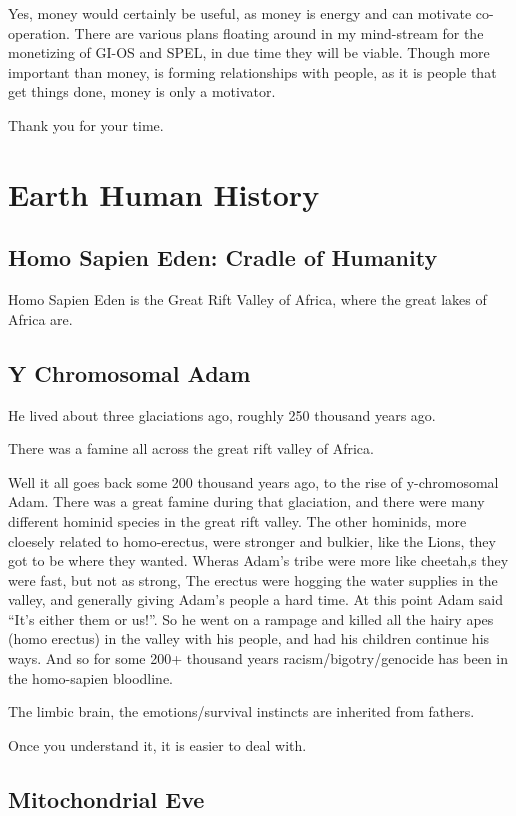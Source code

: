 \documentclass{report}
\begin{document}
Yes, money would certainly be useful,  as money is energy and can motivate
co-operation. There are various plans floating around in my mind-stream for the
monetizing of GI-OS and SPEL, in due time they will be viable.   Though more
important than money, is forming relationships with people, as it is people that
get things done,  money is only a motivator.

Thank you for your time.

\section{Earth Human History}
\subsection{Homo Sapien Eden: Cradle of Humanity}
Homo Sapien Eden is the Great Rift Valley of Africa,
where the great lakes of Africa are.
\subsection{Y Chromosomal Adam}
He lived about three glaciations ago,  roughly 250 thousand years ago.

There was a famine all across the great rift valley of Africa.

	
Well it all goes back some 200 thousand years ago, to the rise of y-chromosomal Adam.
There was a great famine during that glaciation, and there were many different hominid species in the great rift valley.
The other hominids, more cloesely related to homo-erectus, were stronger and bulkier, like the Lions, they got to be where they wanted.
Wheras Adam's tribe were more like cheetah,s they were fast, but not as strong,
The erectus were hogging the water supplies in the valley, and generally giving 
Adam's people a hard time. At this point Adam said ``It's either them or us!''.
So he went on a rampage and killed all the hairy apes (homo erectus) in the valley with his people, and had his children continue his ways. And so for some 200+ thousand years racism/bigotry/genocide has been in the homo-sapien bloodline.

The limbic brain, the emotions/survival instincts are inherited from fathers.

Once you understand it, it is easier to deal with.
\subsection{Mitochondrial Eve}
\end{document}
